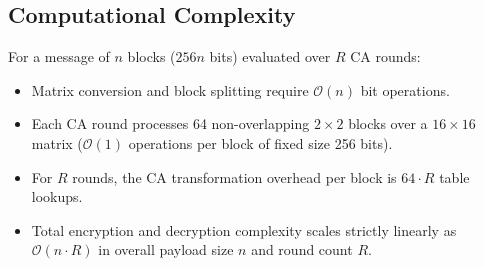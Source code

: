 \subsection{Computational Complexity}
\label{subsec:complexity}
For a message of $n$ blocks ($256n$ bits) evaluated over $R$ CA rounds:
\begin{itemize}
    \item Matrix conversion and block splitting require $\mathcal{O}(n)$ bit operations.
    \item Each CA round processes 64 non-overlapping $2 \times 2$ blocks over a $16 \times 16$ matrix ($\mathcal{O}(1)$ operations per block of fixed size 256 bits).
    \item For $R$ rounds, the CA transformation overhead per block is $64 \cdot R$ table lookups.
    \item Total encryption and decryption complexity scales strictly linearly as $\mathcal{O}(n \cdot R)$ in overall payload size $n$ and round count $R$.
\end{itemize}
